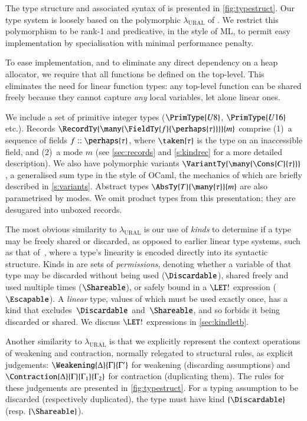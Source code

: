 \documentclass[9pt\ifFinal\else,preprint,nocopyrightspace\fi,\ifAlpha\else natbib,authoryear\fi]{sigplanconf}
\begin{document}
The type structure and associated syntax of \CDSL is presented in \autoref{fig:typestruct}. Our type system is loosely based on the polymorphic
$\lambda_{\text{URAL}}$ of \citet{Ahmed_FM_05}. We restrict this polymorphism to be rank-1 and predicative, in the style of ML, to permit easy implementation
by specialisation with minimal performance penalty. 

To ease implementation, and to eliminate any direct dependency on a heap allocator, we require that all functions be defined on the top-level. 
This eliminates the need for linear function types: any top-level function can be shared freely because they cannot capture \emph{any} local variables, 
let alone linear ones.

We include a set of primitive integer types ($\PrimType{U8}$, $\PrimType{U16}$
etc.). Records $\RecordTy{\many{\FieldTy{f}{\perhaps{\tau}}}}{m}$ comprise
(1)~a sequence of fields $f :: \perhaps{\tau}$, where $\taken{\tau}$ is the type on
an inaccessible field, and (2)~a mode $m$ (see
 \mbox{\autoref{sec:records}} and \autoref{s:kindrec} for a more detailed description). We also have polymorphic variants
$\VariantTy{\many{\Cons{C}{\tau}}}$, a generalised sum type in the style of
OCaml, the mechanics of which are briefly described in
\autoref{s:variants}. Abstract types $\AbsTy{T}{\many{\tau}}{m}$ are also
parametrised by modes.
We omit product types from this presentation; they are desugared into unboxed records.

The most obvious similarity to $\lambda_{\text{URAL}}$ is our use of \emph{kinds} to determine if a type may be freely shared or discarded, as 
opposed to earlier linear type systems, such as that of~\citet{Wadler_90}, where a type's linearity is encoded directly into its syntactic structure. Kinds 
in \CDSL are sets of \emph{permissions}, denoting whether a variable of that type may be discarded without being used ($\Discardable$), shared freely and used 
multiple times ($\Shareable$), or safely bound in a $\LET!$ expression ($\Escapable$). A \emph{linear} type, values of which must be used exactly once, 
has a kind
that excludes~$\Discardable$ and~$\Shareable$, and so forbids it being discarded or shared.
We discuss $\LET!$ expressions in \autoref{sec:kindletb}. 

Another similarity to $\lambda_{\text{URAL}}$ is that we explicitly represent the context operations of weakening and contraction, normally relegated to structural rules, 
as explicit judgements: $\Weakening{\Delta}{\Gamma}{\Gamma'}$ for weakening (discarding assumptions) and $\Contraction{\Delta}{\Gamma}{\Gamma_1}{\Gamma_2}$ for contraction (duplicating them). 
The rules for these judgements are presented in \autoref{fig:typestruct}. For a typing assumption to be discarded (respectively duplicated),
the type must have kind $\{\Discardable\}$ (resp. $\{\Shareable\}$).
\end{document}
